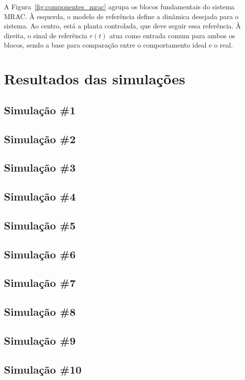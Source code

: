 \documentclass[10pt]{article}
\begin{document}
A Figura~\ref{fig:componentes_mrac} agrupa os blocos fundamentais do sistema MRAC. À esquerda, o modelo de referência define a dinâmica desejada para o sistema. Ao centro, está a planta controlada, que deve seguir essa referência. À direita, o sinal de referência $r(t)$ atua como entrada comum para ambos os blocos, sendo a base para comparação entre o comportamento ideal e o real.

\section{Resultados das simulações}

\subsection{Simulação \#1}

\subsection{Simulação \#2}

\subsection{Simulação \#3}

\subsection{Simulação \#4}

\subsection{Simulação \#5}

\subsection{Simulação \#6}

\subsection{Simulação \#7}

\subsection{Simulação \#8}

\subsection{Simulação \#9}

\subsection{Simulação \#10}
\end{document}
